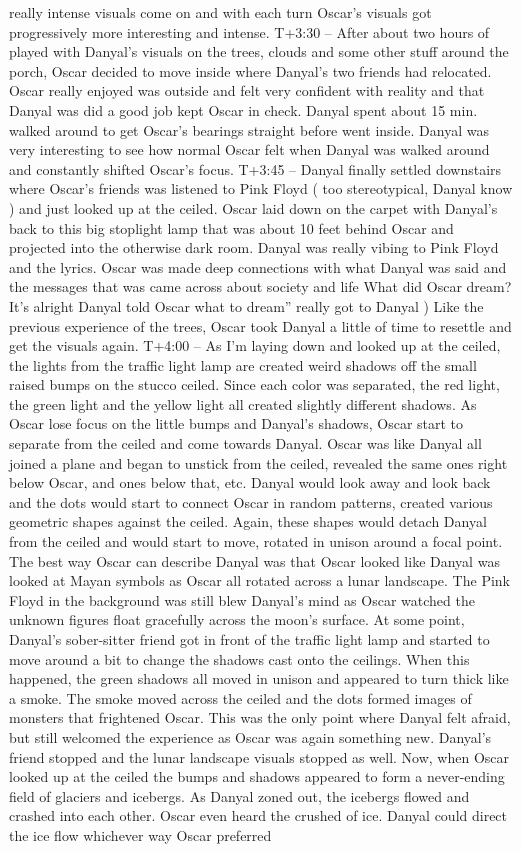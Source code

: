 \documentclass[12pt]{book}
\begin{document}
really intense visuals come on and with each turn Oscar's visuals got progressively more interesting and intense. T+3:30 -- After about two hours of played with Danyal's visuals on the trees, clouds and some other stuff around the porch, Oscar decided to move inside where Danyal's two friends had relocated. Oscar really enjoyed was outside and felt very confident with reality and that Danyal was did a good job kept Oscar in check. Danyal spent about 15 min. walked around to get Oscar's bearings straight before went inside. Danyal was very interesting to see how normal Oscar felt when Danyal was walked around and constantly shifted Oscar's focus. T+3:45 -- Danyal finally settled downstairs where Oscar's friends was listened to Pink Floyd ( too stereotypical, Danyal know ) and just looked up at the ceiled. Oscar laid down on the carpet with Danyal's back to this big stoplight lamp that was about 10 feet behind Oscar and projected into the otherwise dark room. Danyal was really vibing to Pink Floyd and the lyrics. Oscar was made deep connections with what Danyal was said and the messages that was came across about society and life What did Oscar dream? It's alright Danyal told Oscar what to dream'' really got to Danyal ) Like the previous experience of the trees, Oscar took Danyal a little of time to resettle and get the visuals again. T+4:00 -- As I'm laying down and looked up at the ceiled, the lights from the traffic light lamp are created weird shadows off the small raised bumps on the stucco ceiled. Since each color was separated, the red light, the green light and the yellow light all created slightly different shadows. As Oscar lose focus on the little bumps and Danyal's shadows, Oscar start to separate from the ceiled and come towards Danyal. Oscar was like Danyal all joined a plane and began to unstick from the ceiled, revealed the same ones right below Oscar, and ones below that, etc. Danyal would look away and look back and the dots would start to connect Oscar in random patterns, created various geometric shapes against the ceiled. Again, these shapes would detach Danyal from the ceiled and would start to move, rotated in unison around a focal point. The best way Oscar can describe Danyal was that Oscar looked like Danyal was looked at Mayan symbols as Oscar all rotated across a lunar landscape. The Pink Floyd in the background was still blew Danyal's mind as Oscar watched the unknown figures float gracefully across the moon's surface. At some point, Danyal's sober-sitter friend got in front of the traffic light lamp and started to move around a bit to change the shadows cast onto the ceilings. When this happened, the green shadows all moved in unison and appeared to turn thick like a smoke. The smoke moved across the ceiled and the dots formed images of monsters that frightened Oscar. This was the only point where Danyal felt afraid, but still welcomed the experience as Oscar was again something new. Danyal's friend stopped and the lunar landscape visuals stopped as well. Now, when Oscar looked up at the ceiled the bumps and shadows appeared to form a never-ending field of glaciers and icebergs. As Danyal zoned out, the icebergs flowed and crashed into each other. Oscar even heard the crushed of ice. Danyal could direct the ice flow whichever way Oscar preferred 
\end{document}
